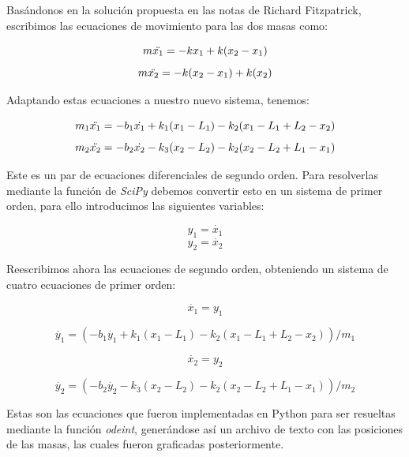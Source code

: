 \documentclass[letterpaper,12pt]{article}
\begin{document}
Basándonos en la solución propuesta en las notas de Richard Fitzpatrick, escribimos las ecuaciones de movimiento para las dos masas como:

\begin{equation*}
    m\Ddot{x_{1}} = - kx_{1} + k(x_{2} - x_{1})    
\end{equation*}
\begin{equation*}
    m\Ddot{x_{2}} = - k(x_{2} - x_{1}) + k(x_{2})    
\end{equation*}

Adaptando estas ecuaciones a nuestro nuevo sistema, tenemos:

\begin{equation}
    m_{1}\Ddot{x_{1}} = -b_{1}\Dot{x_{1}} + k_{1}(x_{1} - L_{1}) - k_{2}(x_{1} - L_{1} + L_{2} - x_{2}) 
\end{equation}
\begin{equation}
    m_{2}\Ddot{x_{2}} = -b_{2}\Dot{x_{2}} - k_{3}(x_{2} - L_{2}) - k_{2}(x_{2} - L_{2} + L_{1} - x_{1})  
\end{equation} 

Este es un par de ecuaciones diferenciales de segundo orden. Para resolverlas mediante la función de \emph{SciPy} debemos convertir esto en un sistema de primer orden, para ello introducimos las siguientes variables:

\[ y_{1} = \Dot{x_{1}} \]
\[ y_{2} = \Dot{x_{2}} \]

Reescribimos ahora las ecuaciones de segundo orden, obteniendo un sistema de cuatro ecuaciones de primer orden:

\[ \Dot{x_{1}} =  y_{1} \]

\begin{equation*}
    \Dot{y_{1}} = ( -b_{1}\Dot{y_{1}} + k_{1}(x_{1} - L_{1}) - k_{2}(x_{1} - L_{1} + L_{2} - x_{2}) ) / m_{1} 
\end{equation*}

\[ \Dot{x_{2}}  = y_{2} \]

\begin{equation*}
    \Dot{y_{2}} = (-b_{2}\Dot{y_{2}} - k_{3}(x_{2} - L_{2}) - k_{2}(x_{2} - L_{2} + L_{1} - x_{1}))/m_{2}  
\end{equation*} 

Estas son las ecuaciones que fueron implementadas en Python para ser resueltas mediante la función \emph{odeint}, generándose así un archivo de texto con las posiciones de las masas, las cuales fueron graficadas posteriormente.
\end{document}
